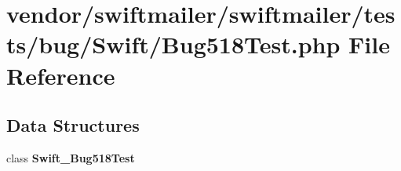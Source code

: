 \section{vendor/swiftmailer/swiftmailer/tests/bug/\+Swift/\+Bug518\+Test.php File Reference}
\label{_bug518_test_8php}
\subsection*{Data Structures}
\begin{DoxyCompactItemize}
\item 
class {\bf Swift\+\_\+\+Bug518\+Test}
\end{DoxyCompactItemize}
